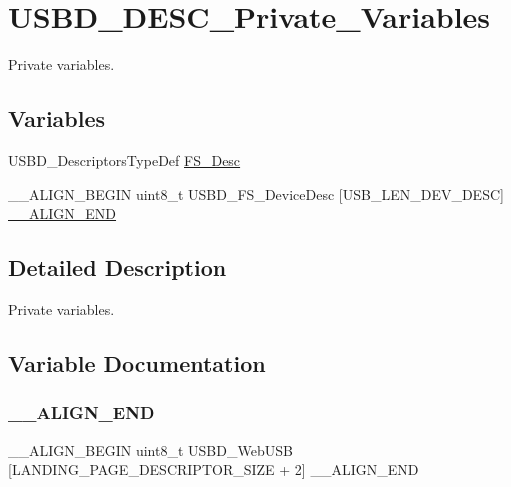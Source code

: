 \hypertarget{group__USBD__DESC__Private__Variables}{}\section{U\+S\+B\+D\+\_\+\+D\+E\+S\+C\+\_\+\+Private\+\_\+\+Variables}
\label{group__USBD__DESC__Private__Variables}


Private variables.  


\subsection*{Variables}
\begin{DoxyCompactItemize}
\item 
U\+S\+B\+D\+\_\+\+Descriptors\+Type\+Def \hyperlink{group__USBD__DESC__Private__Variables_gae36d67393118d9d8531a8d633e23a797}{F\+S\+\_\+\+Desc}
\item 
\+\_\+\+\_\+\+A\+L\+I\+G\+N\+\_\+\+B\+E\+G\+IN uint8\+\_\+t U\+S\+B\+D\+\_\+\+F\+S\+\_\+\+Device\+Desc \mbox{[}U\+S\+B\+\_\+\+L\+E\+N\+\_\+\+D\+E\+V\+\_\+\+D\+E\+SC\mbox{]} \hyperlink{group__USBD__DESC__Private__Variables_ga9a2d4ba633eb986ecaf920508c0a83b5}{\+\_\+\+\_\+\+A\+L\+I\+G\+N\+\_\+\+E\+ND}
\end{DoxyCompactItemize}


\subsection{Detailed Description}
Private variables. 



\subsection{Variable Documentation}
\mbox{\label{group__USBD__DESC__Private__Variables_ga9a2d4ba633eb986ecaf920508c0a83b5}} 
\subsubsection{\texorpdfstring{\+\_\+\+\_\+\+A\+L\+I\+G\+N\+\_\+\+E\+ND}{\_\_ALIGN\_END}}
{\footnotesize\ttfamily \+\_\+\+\_\+\+A\+L\+I\+G\+N\+\_\+\+B\+E\+G\+IN uint8\+\_\+t U\+S\+B\+D\+\_\+\+Web\+U\+SB \mbox{[}L\+A\+N\+D\+I\+N\+G\+\_\+\+P\+A\+G\+E\+\_\+\+D\+E\+S\+C\+R\+I\+P\+T\+O\+R\+\_\+\+S\+I\+ZE + 2\mbox{]} \+\_\+\+\_\+\+A\+L\+I\+G\+N\+\_\+\+E\+ND}

